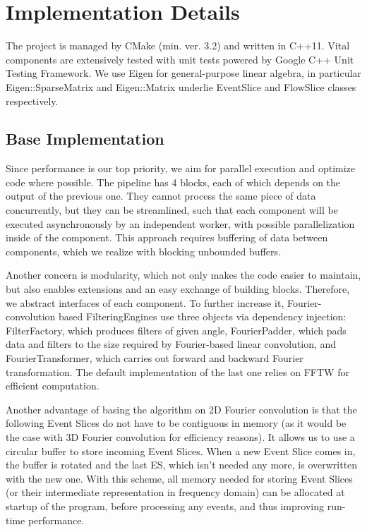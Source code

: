 \section{Implementation Details}
The project is managed by CMake (min. ver. 3.2) and written in C++11. 
Vital components are extensively tested with unit tests powered by Google C++ Unit Testing Framework. 
We use Eigen for general-purpose linear algebra, in particular Eigen::SparseMatrix and Eigen::Matrix underlie EventSlice and FlowSlice classes respectively.

\subsection{Base Implementation}

Since performance is our top priority, we aim for parallel execution and optimize code where possible. 
The pipeline has 4 blocks, each of which depends on the output of the previous one. 
They cannot process the same piece of data concurrently, but they can be streamlined, such that each component will be executed asynchronously by an independent worker, with possible parallelization inside of the component.
This approach requires buffering of data between components, which we realize with blocking unbounded buffers. 

Another concern is modularity, which not only makes the code easier to maintain, but also enables extensions and an easy exchange of building blocks. 
Therefore, we abstract interfaces of each component.
To further increase it, Fourier-convolution based FilteringEngines use three objects via dependency injection: FilterFactory, which produces filters of given angle, FourierPadder, which pads data and filters to the size required by Fourier-based linear convolution, and FourierTransformer, which carries out forward and backward Fourier transformation. The default implementation of the last one relies on FFTW for efficient computation.

Another advantage of basing the algorithm on 2D Fourier convolution is that the following Event Slices do not have to be contiguous in memory (as it would be the case with 3D Fourier convolution for efficiency reasons).
It allows us to use a circular buffer to store incoming Event Slices.
When a new Event Slice comes in, the buffer is rotated and the last ES, which isn't needed any more, is overwritten with the new one.
With this scheme, all memory needed for storing Event Slices (or their intermediate representation in frequency domain) can be allocated at startup of the program, before processing any events, and thus improving run-time performance.

